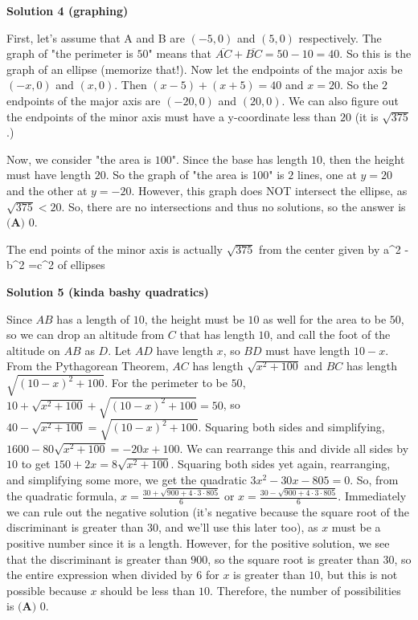 \begin{enumerate}
\textbf{Solution 4 (graphing)}

First, let's assume that A and B are $(-5,0)$ and $(5,0)$ respectively. The graph of "the perimeter is $50$" means that $\overline{AC}+\overline{BC}=50-10=40$. So this is the graph of an ellipse (memorize that!). Now let the endpoints of the major axis be $(-x,0)$ and $(x,0)$. Then $(x-5)+(x+5)=40$ and $x=20$. So the $2$ endpoints of the major axis are $(-20,0)$ and $(20,0)$. We can also figure out the endpoints of the minor axis must have a y-coordinate less than $20$ (it is $\sqrt{375}$.)

 Now, we consider "the area is $100$". Since the base has length $10$, then the height must have length $20$. So the graph of "the area is 100" is $2$ lines, one at $y=20$ and the other at $y=-20$. However, this graph does NOT intersect the ellipse, as $\sqrt{375} < 20$. So, there are no intersections and thus no solutions, so the answer is $\boxed{\textbf{(A) }0}$.

 The end points of the minor axis is actually $\sqrt{375}$ from the center given by a\textasciicircum{}2 -b\textasciicircum{}2 =c\textasciicircum{}2 of ellipses

 



\textbf{Solution 5 (kinda bashy quadratics)}

Since $AB$ has a length of $10$, the height must be $10$ as well for the area to be $50$, so we can drop an altitude from $C$ that has length $10$, and call the foot of the altitude on $AB$ as $D$. Let $AD$ have length $x$, so $BD$ must have length $10-x$. From the Pythagorean Theorem, $AC$ has length $\sqrt{x^2+100}$ and $BC$ has length $\sqrt{(10-x)^2+100}$. For the perimeter to be $50$, $10+\sqrt{x^2+100}+\sqrt{(10-x)^2+100}=50$, so $40-\sqrt{x^2+100}=\sqrt{(10-x)^2+100}$. Squaring both sides and simplifying, $1600-80\sqrt{x^2+100}=-20x+100$. We can rearrange this and divide all sides by $10$ to get $150+2x=8\sqrt{x^2+100}$. Squaring both sides yet again, rearranging, and simplifying some more, we get the quadratic $3x^2-30x-805=0$. So, from the quadratic formula, $x = \frac{30+\sqrt{900+4\cdot3\cdot805}}{6}$ or $x = \frac{30-\sqrt{900+4\cdot3\cdot805}}{6}$. Immediately we can rule out the negative solution (it's negative because the square root of the discriminant is greater than $30$, and we'll use this later too), as $x$ must be a positive number since it is a length. However, for the positive solution, we see that the discriminant is greater than $900$, so the square root is greater than $30$, so the entire expression when divided by $6$ for $x$ is greater than $10$, but this is not possible because $x$ should be less than $10$. Therefore, the number of possibilities is $\boxed{\textbf{(A) }0}$.


\end{enumerate}
